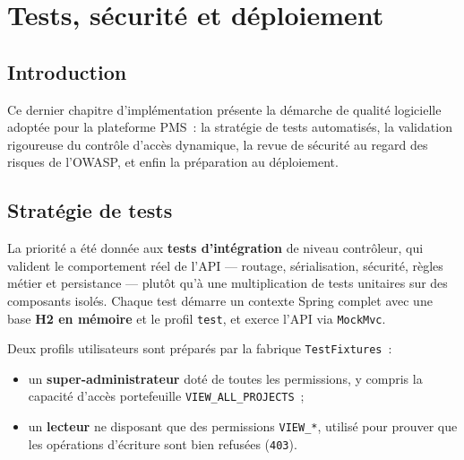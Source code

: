 \chapter{Tests, sécurité et déploiement}

\section*{Introduction}
Ce dernier chapitre d'implémentation présente la démarche de qualité logicielle adoptée pour la
plateforme PMS~: la stratégie de tests automatisés, la validation rigoureuse du contrôle d'accès
dynamique, la revue de sécurité au regard des risques de l'OWASP, et enfin la préparation au
déploiement.

\section{Stratégie de tests}

La priorité a été donnée aux \textbf{tests d'intégration} de niveau contrôleur, qui valident le
comportement réel de l'API --- routage, sérialisation, sécurité, règles métier et persistance ---
plutôt qu'à une multiplication de tests unitaires sur des composants isolés. Chaque test démarre un
contexte Spring complet avec une base \textbf{H2 en mémoire} et le profil \texttt{test}, et exerce
l'API via \texttt{MockMvc}.

Deux profils utilisateurs sont préparés par la fabrique \texttt{TestFixtures}~:
\begin{itemize}
  \item un \textbf{super-administrateur} doté de toutes les permissions, y compris la capacité
        d'accès portefeuille \texttt{VIEW\_ALL\_PROJECTS}~;
  \item un \textbf{lecteur} ne disposant que des permissions \texttt{VIEW\_*}, utilisé pour prouver
        que les opérations d'écriture sont bien refusées (\texttt{403}).
\end{itemize}

